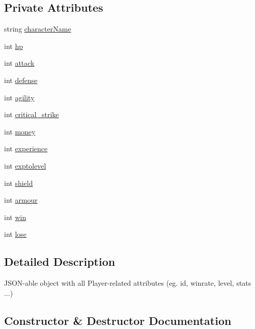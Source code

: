 \subsection*{Private Attributes}
\begin{DoxyCompactItemize}
\item 
string \mbox{\hyperlink{class_player_ade3562b0b9a88c192f0349ac2cafce76}{character\+Name}}
\item 
int \mbox{\hyperlink{class_player_a9159a0bdf10845c484a41823fe3c101e}{hp}}
\item 
int \mbox{\hyperlink{class_player_a9912e57826c51a067ab34db854f31562}{attack}}
\item 
int \mbox{\hyperlink{class_player_a63ed43151a54b62e9d59d8ef4edc0165}{defense}}
\item 
int \mbox{\hyperlink{class_player_ae49bfbaba1583b695d12235263841f96}{agility}}
\item 
int \mbox{\hyperlink{class_player_a5e3cf6dab1263ca2b4b6b94bbcddc788}{critical\+\_\+strike}}
\item 
int \mbox{\hyperlink{class_player_aed37167e4117c2518a154e73fbfc103c}{money}}
\item 
int \mbox{\hyperlink{class_player_a99cc9f5c9fad23b0ddab68ba4eb8eee4}{experience}}
\item 
int \mbox{\hyperlink{class_player_af0a031857f4ade770c6f6688b0c41dc7}{exptolevel}}
\item 
int \mbox{\hyperlink{class_player_af31f60ef7eedd89486623f26edb2b990}{shield}}
\item 
int \mbox{\hyperlink{class_player_a51ccca43f3c0a2549e95bacf1b71e504}{armour}}
\item 
int \mbox{\hyperlink{class_player_a9abe91f5084f15d7a11c7a77f345e517}{win}}
\item 
int \mbox{\hyperlink{class_player_abbb49fe572e8c86068fe4f9d326ab07c}{lose}}
\end{DoxyCompactItemize}


\subsection{Detailed Description}
J\+S\+O\+N-\/able object with all Player-\/related attributes (eg. id, winrate, level, stats ...) 

\subsection{Constructor \& Destructor Documentation}
\mbox{\label{class_player_a712a726b07cf901c040116d6d0c5cc66}} 
